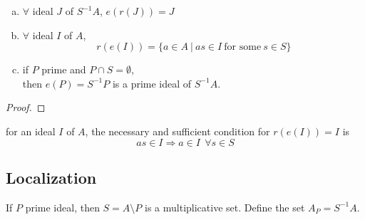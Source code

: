 \documentclass{article}
\theoremstyle{definition}
\newenvironment{prop}[1]
{\renewcommand\theinnerprop{#1}\innerprop}
{\endinnerprop}
\newenvironment{cor}[1]
{\renewcommand\theinnercor{#1}\innercor}
{\endinnercor}
\begin{document}
\begin{prop}{6.3} \label{prop.6.3}
  \begin{enumerate}[a.]
    \item $\forall$ ideal $J$ of $S^{-1}A$, $e(r(J))=J$
    \item $\forall$ ideal $I$ of $A$,
      $$r(e(I)) = \{ a \in A ~|~ as \in I ~\text{for some}~ s \in S \}$$
    \item if $P$ prime and $P \cap S = \emptyset$,\\
      then $e(P)=S^{-1}P$ is a prime ideal of $S^{-1}A$.
  \end{enumerate}
\end{prop}
\begin{proof}
\end{proof}

\begin{cor}{6.3} \label{cor.6.3}
    for an ideal $I$ of $A$, the necessary and sufficient condition for
    $r(e(I))=I$ is
      $$as \in I \Longrightarrow a \in I~~ \forall s \in S$$
\end{cor}


\subsection{Localization}

If $P$ prime ideal, then $S=A \setminus P$ is a multiplicative set.
Define the set $A_P=S^{-1}A$.
\end{document}
